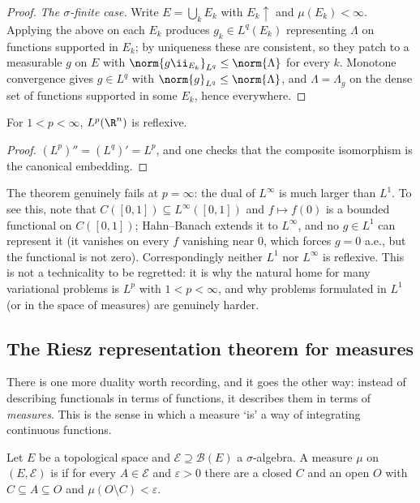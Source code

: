 \begin{proof}
	\emph{The $\sigma$-finite case.} Write $E = \bigcup_k E_k$ with $E_k \uparrow$ and $\mu(E_k) < \infty$. Applying the above on each $E_k$ produces $g_k \in L^q(E_k)$ representing $\Lambda$ on functions supported in $E_k$; by uniqueness these are consistent, so they patch to a measurable $g$ on $E$ with $\norm{g \ii_{E_k}}_{L^q}\le\norm{\Lambda}$ for every $k$. Monotone convergence gives $g \in L^q$ with $\norm{g}_{L^q}\le\norm{\Lambda}$, and $\Lambda = \Lambda_g$ on the dense set of functions supported in some $E_k$, hence everywhere.
\end{proof}

\begin{corollary}\label{cor:lpreflexive}
	For $1 < p < \infty$, $L^p(\R^n)$ is reflexive.
\end{corollary}

\begin{proof}
	$(L^p)'' = (L^q)' = L^p$, and one checks that the composite isomorphism is the canonical embedding.
\end{proof}

The theorem genuinely fails at $p = \infty$: the dual of $L^\infty$ is much larger than $L^1$. To see this, note that $C([0,1]) \subseteq L^\infty([0,1])$ and $f \mapsto f(0)$ is a bounded functional on $C([0,1])$; Hahn--Banach extends it to $L^\infty$, and no $g \in L^1$ can represent it (it vanishes on every $f$ vanishing near $0$, which forces $g = 0$ a.e., but the functional is not zero). Correspondingly neither $L^1$ nor $L^\infty$ is reflexive. This is not a technicality to be regretted: it is why the natural home for many variational problems is $L^p$ with $1 < p< \infty$, and why problems formulated in $L^1$ (or in the space of measures) are genuinely harder.

\subsection{The Riesz representation theorem for measures}

There is one more duality worth recording, and it goes the other way: instead of describing functionals in terms of functions, it describes them in terms of \emph{measures}. This is the sense in which a measure `is' a way of integrating continuous functions.

\begin{definition}
	Let $E$ be a topological space and $\mathcal{E} \supseteq \mathcal{B}(E)$ a $\sigma$-algebra. A measure $\mu$ on $(E,\mathcal{E})$ is  if for every $A \in \mathcal{E}$ and $\varepsilon > 0$ there are a closed $C$ and an open $O$ with $C \subseteq A \subseteq O$ and $\mu(O \setminus C) < \varepsilon$.
\end{definition}

